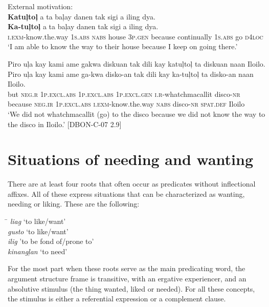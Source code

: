 \ea
External motivation: \\
\textbf{Katuļtoļ}	a	ta	baļay	danen	tak	sigi	a	iling	dya. \\\smallskip
\gll \textbf{Ka-tuļtoļ}	a	ta	baļay	danen	tak	sigi	a	iling	dya. \\
\textsc{i.exm}-know.the.way	1\textsc{s.abs}	\textsc{nabs}	house	3\textsc{p.gen}	because	continually	1\textsc{s.abs}	go	\textsc{d4loc} \\
\glt ‘I am able to know the way to their house because I keep on going there.’
\z

\newpage
\ea
Piro	uļa	kay	kami	ame	gakwa diskuan	tak	dili	kay	katuļtoļ	ta	diskuan naan	Iloilo. \\\smallskip
\gll Piro	uļa	kay	kami	ame	ga-kwa disko-an	tak	dili	kay	ka-tuļtoļ	ta	disko-an naan	Iloilo. \\
but		\textsc{neg.r}	1\textsc{p.excl.abs}	1\textsc{p.excl.abs}	1\textsc{p.excl.gen}	\textsc{i.r}-whatchmacallit
disco-\textsc{nr}	because	\textsc{neg.ir}	1\textsc{p.excl.abs}	\textsc{i.exm}-know.the.way	\textsc{nabs}	disco-\textsc{nr} \textsc{spat.def}	Iloilo \\
\glt ‘We did not whatchmacallit (go) to the disco because we did not know the way to the disco in Iloilo.’ [DBON-C-07 2.9]
\z

\section{Situations of needing and wanting}
\label{sec:needingwanting}

There are at least four roots that often occur as predicates without inflectional affixes. All of these express situations that can be characterized as wanting, needing or liking. These are the following:

\ea
\begin{tabbing}
\hspace{2cm} \= \kill
\textit{liag} \> ‘to like/want’ \\
\textit{gusto} \> ‘to like/want’ \\
\textit{ilig} \>  'to be fond of/prone to' \\   
\textit{kinangļan} \> ‘to need’
\end{tabbing}
\z

For the most part when these roots serve as the main predicating word, the argument structure frame is transitive, with an ergative experiencer, and an absolutive stimulus (the thing wanted, liked or needed). For all these concepts, the stimulus is either a referential expression or a complement clause.

